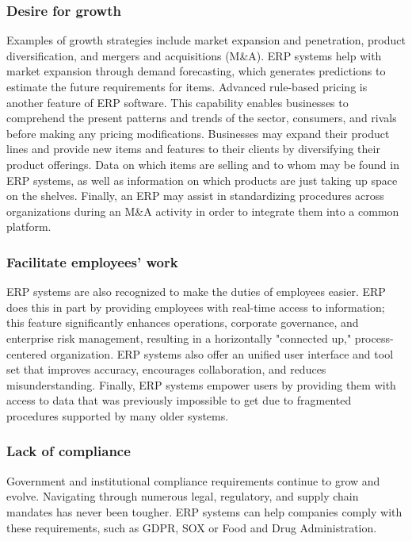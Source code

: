 \subsubsection{Desire for growth}
Examples of growth strategies include market expansion and penetration, product diversification, and mergers and acquisitions (M\&A).
ERP systems help with market expansion through demand forecasting, which generates predictions to estimate the future requirements for items.
Advanced rule-based pricing is another feature of ERP software. This capability enables businesses to comprehend the present patterns and trends of the sector, consumers, and rivals before making any pricing modifications.
Businesses may expand their product lines and provide new items and features to their clients by diversifying their product offerings. Data on which items are selling and to whom may be found in ERP systems, as well as information on which products are just taking up space on the shelves.
Finally, an ERP may assist in standardizing procedures across organizations during an M\&A activity in order to integrate them into a common platform.

\subsubsection{Facilitate employees' work}
ERP systems are also recognized to make the duties of employees easier. ERP does this in part by providing employees with real-time access to information; this feature significantly enhances operations, corporate governance, and enterprise risk management, resulting in a horizontally "connected up," process-centered organization. ERP systems also offer an unified user interface and tool set that improves accuracy, encourages collaboration, and reduces misunderstanding. Finally, ERP systems empower users by providing them with access to data that was previously impossible to get due to fragmented procedures supported by many older systems.

\subsubsection{Lack of compliance}
Government and institutional compliance requirements continue to grow and evolve. Navigating through numerous legal, regulatory, and supply chain mandates has never been tougher. ERP systems can help companies comply with these requirements, such as GDPR, SOX or Food and Drug Administration.

